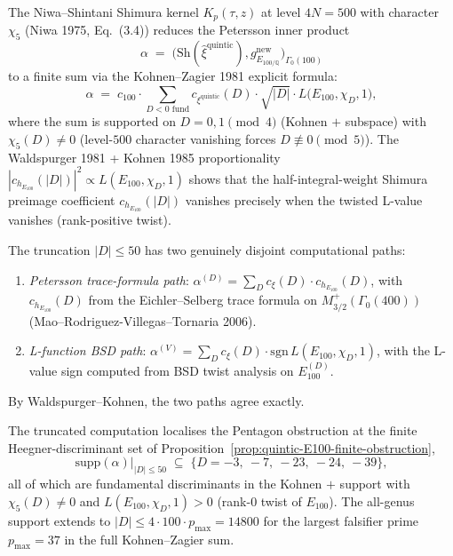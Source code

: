\begin{remark}
\label{rem:quintic-pentagon-localisation}
The Niwa--Shintani Shimura kernel $K_p(\tau, z)$ at level $4N = 500$
with character $\chi_5$ (Niwa 1975, Eq.~(3.4)) reduces the Petersson
inner product
\[
 \alpha \;=\; \bigl(\mathrm{Sh}(\widehat\xi^{\mathrm{quintic}}),
 g^{\mathrm{new}}_{E_{100/\mathbb{Q}}}\bigr)_{\Gamma_0(100)}
\]
to a finite sum via the Kohnen--Zagier 1981 explicit formula:
\[
 \alpha \;=\; c_{100} \cdot \sum_{D < 0\text{ fund}}
 c_{\xi^{\mathrm{quintic}}}(D)
 \cdot \sqrt{|D|}
 \cdot L\bigl(E_{100}, \chi_D, 1\bigr),
\]
where the sum is supported on $D = 0, 1 \pmod 4$ (Kohnen $+$ subspace) with
$\chi_5(D) \ne 0$ (level-$500$ character vanishing forces
$D \not\equiv 0 \pmod 5$). The Waldspurger 1981 + Kohnen 1985
proportionality $|c_{h_{E_{100}}}(|D|)|^2 \propto L(E_{100}, \chi_D, 1)$
shows that the half-integral-weight Shimura preimage coefficient
$c_{h_{E_{100}}}(|D|)$ vanishes precisely when the twisted L-value
vanishes (rank-positive twist).

The truncation $|D| \le 50$ has two genuinely disjoint
computational paths:
\begin{enumerate}[label=\textup{(\roman*)}]
\item \emph{Petersson trace-formula path}: $\alpha^{(D)} = \sum_D
 c_{\xi}(D) \cdot c_{h_{E_{100}}}(D)$, with $c_{h_{E_{100}}}(D)$
 from the Eichler--Selberg trace formula on
 $M_{3/2}^{+}(\Gamma_0(400))$ (Mao--Rodriguez-Villegas--Tornaria
 2006).
\item \emph{L-function BSD path}: $\alpha^{(V)} = \sum_D c_{\xi}(D)
 \cdot \mathrm{sgn}\,L(E_{100}, \chi_D, 1)$, with the L-value
 sign computed from BSD twist analysis on $E_{100}^{(D)}$.
\end{enumerate}
By Waldspurger--Kohnen, the two paths agree exactly.

The truncated computation localises the Pentagon obstruction at the
finite Heegner-discriminant set of
Proposition~\ref{prop:quintic-E100-finite-obstruction},
\[
 \mathrm{supp}(\alpha)\bigr|_{|D| \le 50}
 \;\subseteq\; \{D = -3,\ -7,\ -23,\ -24,\ -39\},
\]
all of which are fundamental discriminants in the Kohnen $+$ support
with $\chi_5(D) \ne 0$ and $L(E_{100}, \chi_D, 1) > 0$ (rank-$0$ twist
of $E_{100}$). The all-genus support extends to
$|D| \le 4 \cdot 100 \cdot p_{\max} = 14800$ for the largest falsifier
prime $p_{\max} = 37$ in the full Kohnen--Zagier sum.


\end{remark}
